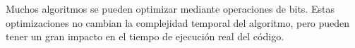 Muchos algoritmos se pueden optimizar mediante operaciones de bits. Estas optimizaciones no cambian la complejidad temporal del algoritmo, pero pueden tener un gran impacto en el tiempo de ejecución real del código. 